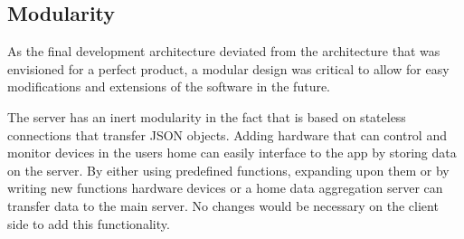 \subsection{Modularity}
\label{sec:modularity}
As the final development architecture deviated from the architecture that was envisioned for a perfect product, a modular design was critical to allow for easy modifications and 
extensions of the software in the future. 

The server has an inert  modularity in the fact that is based on stateless connections that transfer JSON objects. Adding hardware that can control and monitor devices in the users 
home can easily interface to the app by storing data on the server. By either using predefined functions, expanding upon them or by writing new functions hardware devices or a home data aggregation server can transfer data to the main server. No changes would be necessary on the client side to add this functionality. 
